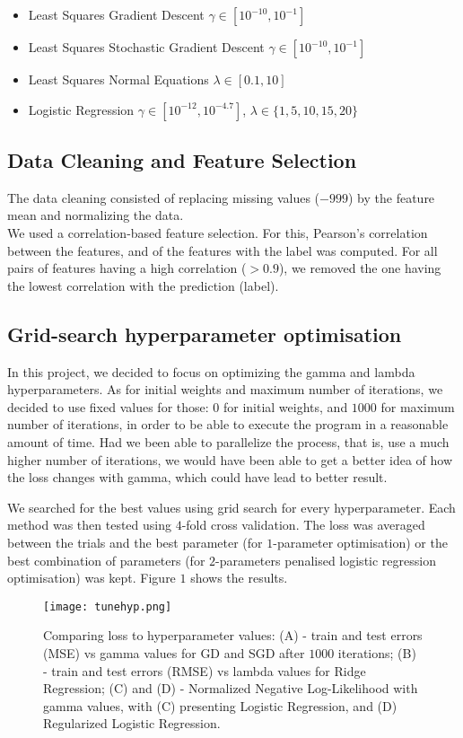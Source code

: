 \documentclass{article}
\begin{document}
		\begin{itemize}
			\item Least Squares Gradient Descent $\gamma \in [10^{-10}, 10^{-1}]$
			\item Least Squares Stochastic Gradient Descent $\gamma \in [10^{-10}, 10^{-1}]$
			\item Least Squares Normal Equations $\lambda \in [0.1, 10]$
			\item Logistic Regression $\gamma \in [10^{-12}, 10^{-4.7}]$, $\lambda \in \{1, 5, 10, 15, 20\} $
		\end{itemize}
	
	
	\subsection{Data Cleaning and Feature Selection}
	The data cleaning consisted of replacing missing values ($-999$) by the feature mean and normalizing the data.
	\\
	We used a correlation-based feature selection. For this, Pearson’s correlation between the features, and of the features with the label was computed. For all pairs of features having a high correlation ($> 0.9$), we removed the one having the lowest correlation with the prediction (label).
	
	\subsection{Grid-search hyperparameter optimisation}
	In this project, we decided to focus on optimizing the gamma and lambda hyperparameters. As for initial weights and maximum number of iterations, we decided to use fixed values for those: $0$ for initial weights, and $1000$ for maximum number of iterations, in order to be able to execute the program in a reasonable amount of time. Had we been able to parallelize the process, that is, use a much higher number of iterations, we would have been able to get a better idea of how the loss changes with gamma, which could have lead to better result.

	We searched for the best values using grid search for every hyperparameter. Each method was then tested using $4$-fold cross validation. The loss was averaged between the trials and the best parameter (for $1$-parameter optimisation) or the best combination of parameters (for $2$-parameters penalised logistic regression optimisation) was kept. Figure $1$ shows the results.
	
	\begin{figure}\label{fig1}
		\centering
		\texttt{[image: tunehyp.png]}
		\caption{Comparing loss to hyperparameter values:
			(A) - train and test errors (MSE) vs gamma values for GD and SGD after $1000$ iterations;
			(B) - train and test errors (RMSE) vs lambda values for Ridge Regression;
			(C) and (D) - Normalized Negative Log-Likelihood with gamma values, with (C) presenting Logistic Regression, and (D) Regularized Logistic Regression.}
	\end{figure}
	
\end{document}
